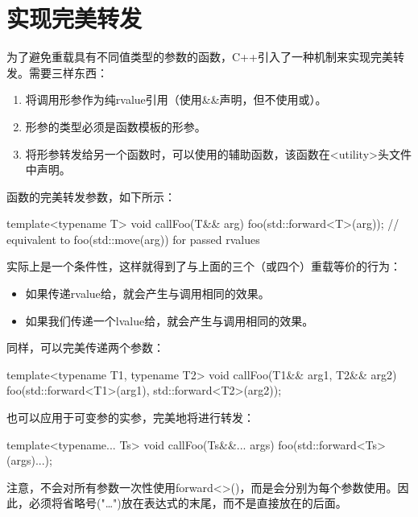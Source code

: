 \section{实现完美转发}
为了避免重载具有不同值类型的参数的函数，C++引入了一种机制来实现完美转发。需要三样东西：

\begin{enumerate}
	\item 将调用形参作为纯rvalue引用（使用\&\&声明，但不使用或）。
	\item 形参的类型必须是函数模板的形参。
	\item 将形参转发给另一个函数时，可以使用的辅助函数，该函数在<utility>头文件中声明。
\end{enumerate}

函数的完美转发参数，如下所示：

\begin{cppcode}
template<typename T>
void callFoo(T&& arg) {
	foo(std::forward<T>(arg)); // equivalent to foo(std::move(arg)) for passed rvalues
}
\end{cppcode}

实际上是一个条件性，这样就得到了与上面的三个（或四个）重载等价的行为：

\begin{itemize}
	\item 如果传递rvalue给，就会产生与调用相同的效果。
	\item 如果我们传递一个lvalue给，就会产生与调用相同的效果。
\end{itemize}

同样，可以完美传递两个参数：

\begin{cppcode}
template<typename T1, typename T2>
void callFoo(T1&& arg1, T2&& arg2) {
	foo(std::forward<T1>(arg1), std::forward<T2>(arg2));
}
\end{cppcode}

也可以应用于可变参的实参，完美地将进行转发：

\begin{cppcode}
template<typename... Ts>
void callFoo(Ts&&... args) {
	foo(std::forward<Ts>(args)...);
}
\end{cppcode}

注意，不会对所有参数一次性使用forward<>()，而是会分别为每个参数使用。因此，必须将省略号("…")放在表达式的末尾，而不是直接放在的后面。

